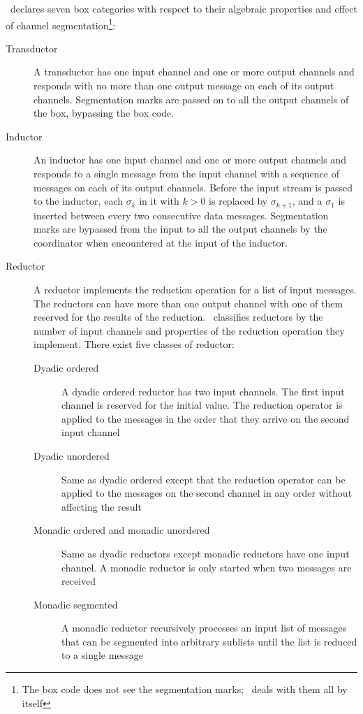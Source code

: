 \ak\ declares seven box categories with respect to their algebraic properties and effect of channel segmentation\footnote{The box code does not see the segmentation marks; \ak\ deals with them all by itself}:
\begin{description}
\item[Transductor]
A transductor has one input channel and one or more output channels and responds with no more than one output message on each of its output channels. Segmentation marks are passed on to all the output channels of the box, bypassing the box code.

\item[Inductor]
An inductor has one input channel and one or more output channels and responds to a single message from the input channel with a sequence of messages on each of its output channels. Before the input stream is passed to the inductor, each $\sigma_k$ in it with $k > 0$ is replaced by $\sigma_{k+1}$, and a $\sigma_1$ is inserted between every two consecutive data messages. Segmentation marks are bypassed from the input to all the output channels by the coordinator when encountered at the input of the inductor.

\item[Reductor] A reductor implements the reduction operation for a list of input messages. The reductors can have more than one output channel with one of them reserved for the results of the reduction. \ak\ classifies reductors by the number of input channels and properties of the reduction operation they implement. There exist five classes of reductor:

    \begin{description}
    \item[Dyadic ordered] A dyadic ordered reductor has two input channels. The first input channel is reserved for the initial value. The reduction operator is applied to the messages in the order that they arrive on the second input channel

    \item[Dyadic unordered] Same as dyadic ordered except that the reduction operator can be applied to the messages on the second channel in any order without affecting the result

    \item[Monadic ordered and monadic unordered] Same as dyadic reductors except monadic reductors have one input channel. A monadic reductor is only started when two messages are received

    \item[Monadic segmented] A monadic reductor recursively processes an input list of messages that can be segmented into arbitrary sublists until the list is reduced to a single message
    \end{description}
\end{description}

